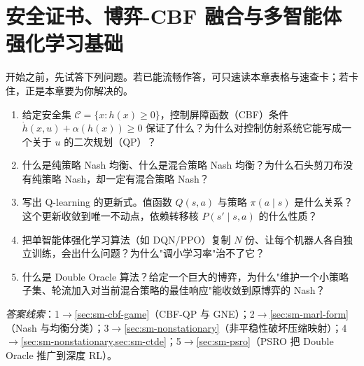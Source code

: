 \chapter{安全证书、博弈-CBF 融合与多智能体强化学习基础}
\label{ch:plan-safemarl}



\begin{practice}[前置自测]
开始之前，先试答下列问题。若已能流畅作答，可只速读本章表格与速查卡；若卡住，正是本章要为你解决的。
\begin{enumerate}
  \item 给定安全集 $\mathcal{C}=\{x:h(x)\ge0\}$，控制屏障函数（CBF）条件 $\dot h(x,u)+\alpha(h(x))\ge0$ 保证了什么？为什么对控制仿射系统它能写成一个关于 $u$ 的二次规划（QP）？
  \item 什么是纯策略 Nash 均衡、什么是混合策略 Nash 均衡？为什么石头剪刀布没有纯策略 Nash，却一定有混合策略 Nash？
  \item 写出 Q-learning 的更新式。值函数 $Q(s,a)$ 与策略 $\pi(a\mid s)$ 是什么关系？这个更新收敛到唯一不动点，依赖转移核 $P(s'\mid s,a)$ 的什么性质？
  \item 把单智能体强化学习算法（如 DQN/PPO）复制 $N$ 份、让每个机器人各自独立训练，会出什么问题？为什么"调小学习率"治不了它？
  \item 什么是 Double Oracle 算法？给定一个巨大的博弈，为什么"维护一个小策略子集、轮流加入对当前混合策略的最佳响应"能收敛到原博弈的 Nash？
\end{enumerate}
\noindent\emph{答案线索}：1$\to$\cref{sec:sm-cbf-game}（CBF-QP 与 GNE）；2$\to$\cref{sec:sm-marl-form}（Nash 与均衡分类）；3$\to$\cref{sec:sm-nonstationary}（非平稳性破坏压缩映射）；4$\to$\cref{sec:sm-nonstationary,sec:sm-ctde}；5$\to$\cref{sec:sm-psro}（PSRO 把 Double Oracle 推广到深度 RL）。
\end{practice}

